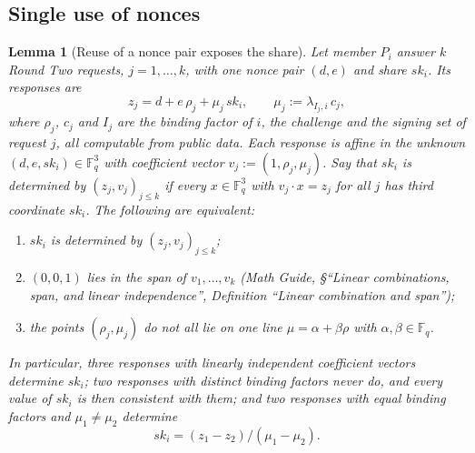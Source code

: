 \documentclass[11pt,a4paper]{article}
\newtheorem{lemma}[theorem]{Lemma}
\theoremstyle{definition}
\newcommand{\F}{\mathbb{F}}
\newcommand{\Fq}{\F_q}
\begin{document}
\subsection{Single use of nonces}\label{sec:sign-nonces}

\begin{lemma}[Reuse of a nonce pair exposes the share]\label{lem:nonce-reuse}
Let member \(P_i\) answer \(k\) Round Two requests, \(j = 1, \dots, k\),
with one nonce pair \((d, e)\) and share \(\mathit{sk}_i\). Its responses
are
\[
  z_j = d + e\, \rho_j + \mu_j\, \mathit{sk}_i , \qquad
  \mu_j := \lambda_{I_j,i}\, c_j ,
\]
where \(\rho_j\), \(c_j\) and \(I_j\) are the binding factor of \(i\), the
challenge and the signing set of request \(j\), all computable from public
data. Each response is affine in the unknown
\((d, e, \mathit{sk}_i) \in \Fq^3\) with coefficient vector
\(v_j := (1, \rho_j, \mu_j)\). Say that \(\mathit{sk}_i\) is
\emph{determined} by \((z_j, v_j)_{j \le k}\) if every
\(x \in \Fq^3\) with \(v_j \cdot x = z_j\) for all \(j\) has third
coordinate \(\mathit{sk}_i\). The following are equivalent:
\begin{enumerate}
\item[(a)] \(\mathit{sk}_i\) is determined by \((z_j, v_j)_{j \le k}\);
\item[(b)] \((0, 0, 1)\) lies in the span of \(v_1, \dots, v_k\)
  (\emph{Math Guide}, \S``Linear combinations, span, and linear
  independence'', Definition ``Linear combination and span'');
\item[(c)] the points \((\rho_j, \mu_j)\) do not all lie on one line
  \(\mu = \alpha + \beta \rho\) with \(\alpha, \beta \in \Fq\).
\end{enumerate}
In particular, three responses with linearly independent coefficient
vectors determine \(\mathit{sk}_i\); two responses with distinct binding
factors never do, and every value of \(\mathit{sk}_i\) is then consistent
with them; and two responses with equal binding factors and
\(\mu_1 \ne \mu_2\) determine
\[
  \mathit{sk}_i = (z_1 - z_2) / (\mu_1 - \mu_2) .
\]
\end{lemma}
\end{document}
